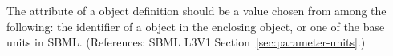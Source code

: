 The  attribute of a \Parameter object definition should be a
value chosen from among the following: the identifier of a \UnitDefinition
object in the enclosing \Model object, or one of the base units in SBML.
(References: SBML L3V1 Section~\ref{sec:parameter-units}.)
